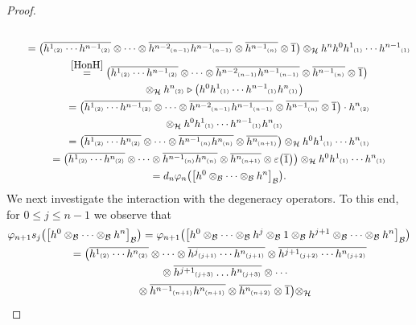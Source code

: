 \documentclass[pdftex]{sigma}
\numberwithin{equation}{section}
\newcommand{\ps}[1]{~\hspace{-4pt}_{^{(#1)}}}
\newcommand{\wbar}[1]{\overline{#1}}
\begin{document}
\begin{proof}
\begin{gather*}
\\
\qquad
=\big(\wbar{h^1\ps{2}\cdots h^{n-1}\ps{2}} \otimes \cdots
\otimes \wbar{h^{n-2}\ps{n-1}h^{n-1}\ps{n-1}} \otimes \wbar{h^{n-1}\ps{n}} \otimes
\wbar{1}\big)
 \otimes_{\cal H} h^nh^0h^1\ps{1}\cdots h^{n-1}\ps{1}
\\
\qquad
\stackrel{\eqref{HonH}}{=}
\big(\wbar{h^1\ps{2}\cdots h^{n-1}\ps{2}} \otimes\cdots
\otimes \wbar{h^{n-2}\ps{n-1}h^{n-1}\ps{n-1}} \otimes \wbar{h^{n-1}\ps{n}} \otimes
\wbar{1}\big) \\
\qquad\hphantom{=}{}
\otimes_{\cal H} h^n\ps{2}\triangleright \big(h^0h^1\ps{1}\cdots h^{n-1}\ps{1}h^n\ps{1}\big)
\\
\qquad
=\big(\wbar{h^1\ps{2}\cdots h^{n-1}\ps{2}} \otimes\cdots
\otimes \wbar{h^{n-2}\ps{n-1}h^{n-1}\ps{n-1}} \otimes \wbar{h^{n-1}\ps{n}} \otimes \wbar{1}\big)\cdot
h^n\ps{2} \\
\qquad
\phantom{=}
\otimes_{\cal H} h^0h^1\ps{1}\cdots h^{n-1}\ps{1}h^n\ps{1}
\\
\qquad
=\big(\wbar{h^1\ps{2}\cdots h^{n}\ps{2}} \otimes\dots\otimes \wbar{h^{n-1}\ps{n}h^{n}\ps{n}} \otimes
\wbar{h^{n}\ps{n+1}} \big) \otimes_{\cal H} h^0h^1\ps{1}\cdots h^{n}\ps{1}
\\
\qquad
=\big(\wbar{h^1\ps{2}\cdots h^{n}\ps{2}} \otimes\cdots\otimes \wbar{h^{n-1}\ps{n}h^{n}\ps{n}} \otimes
\wbar{h^{n}\ps{n+1}}\otimes\varepsilon\big(\wbar{1}\big) \big) \otimes_{\cal H} h^0h^1\ps{1}\cdots h^{n}\ps{1}
\\
\qquad
=d_n\varphi_{n}\big(\big[h^0\otimes_{\cal B}\cdots\otimes_{\cal B} h^n\big]_{\cal B}\big).
\end{gather*}
We next investigate the interaction with the degeneracy operators.
To this end, for $0\leq j \leq n-1$ we observe that
\begin{gather*}
\varphi_{n+1}s_j\big(\big[h^0\otimes_{\cal B}\cdots\otimes_{\cal B} h^n\big]_{\cal B}\big)
=\varphi_{n+1}\big(\big[h^0\otimes_{\cal B}\cdots\otimes_{\cal B} h^j\otimes_{\cal B} 1\otimes_{\cal B} h^{j+1}\otimes_{\cal
B}\cdots\otimes_{\cal B} h^{n}\big]_{\cal B}\big)
\\
\qquad
=\big(\wbar{h^1\ps{2}\cdots h^n\ps{2}} \otimes\cdots
\otimes \wbar{h^j\ps{j+1}\cdots h^n\ps{j+1}} \otimes \wbar{h^{j+1}\ps{j+2}\cdots h^n\ps{j+2}}\\
\qquad
\phantom{=}{}
\otimes
\wbar{h^{j+1}\ps{j+3}\dots h^n\ps{j+3}}\otimes\cdots
\\
\qquad
\phantom{=}{}
\otimes \wbar{h^{n-1}\ps{n+1}h^n\ps{n+1}} \otimes \wbar{h^n\ps{n+2}} \otimes \wbar{1}\big) \otimes_{\cal H}

\end{gather*}
\end{proof}
\end{document}
